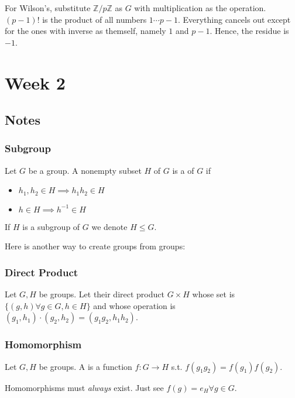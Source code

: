 \documentclass{scrartcl}
\begin{document}
For Wilson's, substitute $\mathbb{Z}/p\mathbb{Z}$ as $G$ with multiplication as the operation. $(p-1)!$ is the product of all numbers $1 \cdots p-1$. Everything cancels out except for the ones with inverse as themself, namely $1$ and $p-1$. Hence, the residue is $-1$. \blackqed 

\section{Week 2}

\subsection{Notes}
\subsubsection{Subgroup}
\begin{definition}
	Let $G$ be a group. A nonempty subset $H$ of $G$ is a  of $G$ if
	\begin{itemize}
		\item $h_1,h_2 \in H \implies h_1h_2 \in H$
		\item $h \in H \implies h^{-1} \in H$
	\end{itemize}
	If $H$ is a subgroup of $G$ we denote $H \le G$.
\end{definition}
Here is another way to create groups from groups:
\subsubsection{Direct Product}
\begin{definition}
	Let $G, H$ be groups. Let their direct product $G \times H$ whose set is $\{(g,h) \forall g \in G, h \in H \}$ and whose operation is $(g_1,h_1) \cdot (g_2,h_2) = (g_1g_2, h_1h_2)$.
\end{definition}

\subsubsection{Homomorphism}
\begin{definition}
	Let $G, H$ be groups. A  is a function $f : G \rightarrow H$ s.t. $f(g_1g_2) = f(g_1)f(g_2)$.
\end{definition}

Homomorphisms must \textit{always} exist. Just see $f(g) = e_H \forall g \in G$.
\end{document}
